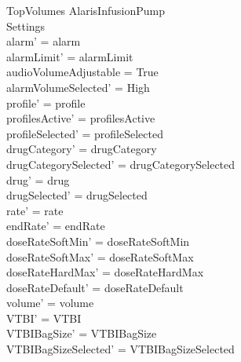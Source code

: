 \begin{schema}{TopVolumes}
	\Delta AlarisInfusionPump\\
	 Settings\\
	\where
	alarm' = alarm\\
	alarmLimit' = alarmLimit\\
	audioVolumeAdjustable = True\\
	alarmVolumeSelected' = High\\
	profile' = profile\\
	profilesActive' = profilesActive\\  
	profileSelected' = profileSelected\\
	drugCategory' = drugCategory\\ drugCategorySelected' = drugCategorySelected\\
	drug' = drug\\ drugSelected' = drugSelected\\
	rate' = rate\\
	endRate' = endRate\\
	doseRateSoftMin' = doseRateSoftMin\\
	doseRateSoftMax' = doseRateSoftMax\\
	doseRateHardMax' = doseRateHardMax\\
	doseRateDefault' = doseRateDefault\\
	volume' = volume\\
	VTBI' = VTBI\\
	VTBIBagSize' = VTBIBagSize\\ VTBIBagSizeSelected' = VTBIBagSizeSelected\\

\end{schema}
